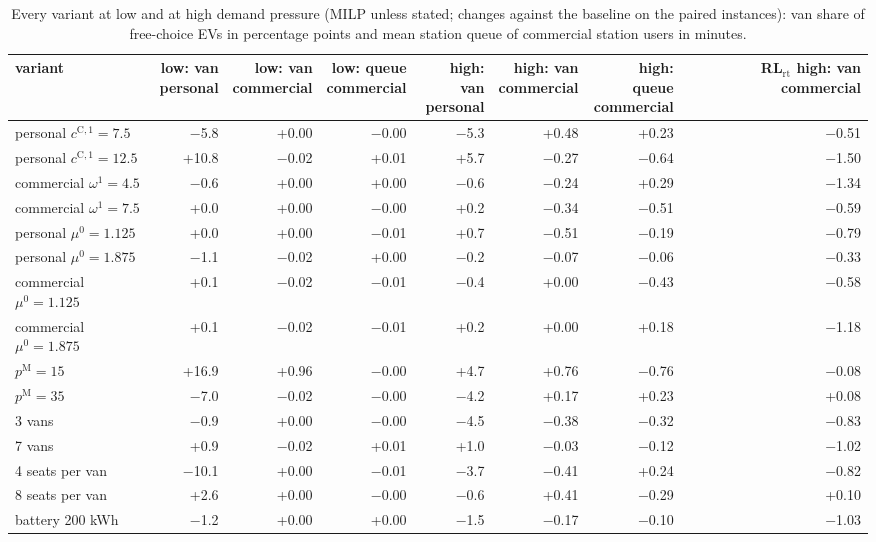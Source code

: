 \begin{table}[H]\centering
\scriptsize
\caption{Every variant at low and at high demand pressure (MILP unless stated; changes against the baseline on the paired instances): van share of free-choice EVs in percentage points and mean station queue of commercial station users in minutes.}\label{tab:pressexp}
\begin{adjustbox}{max width=\textwidth}\begin{tabular}{lrrrrrrr}\toprule
variant & \shortstack{low: van\\personal} & \shortstack{low: van\\commercial} & \shortstack{low: queue\\commercial} & \shortstack{high: van\\personal} & \shortstack{high: van\\commercial} & \shortstack{high: queue\\commercial} & \shortstack{RL$_{\mathrm{rt}}$ high: van\\commercial} \\ \midrule
personal $c^{\mathrm C,1}=7.5$ & $-$5.8 & +0.00 & $-$0.00 & $-$5.3 & +0.48 & +0.23 & $-$0.51 \\
personal $c^{\mathrm C,1}=12.5$ & +10.8 & $-$0.02 & +0.01 & +5.7 & $-$0.27 & $-$0.64 & $-$1.50 \\
commercial $\omega^{1}=4.5$ & $-$0.6 & +0.00 & +0.00 & $-$0.6 & $-$0.24 & +0.29 & $-$1.34 \\
commercial $\omega^{1}=7.5$ & +0.0 & +0.00 & $-$0.00 & +0.2 & $-$0.34 & $-$0.51 & $-$0.59 \\
personal $\mu^{0}=1.125$ & +0.0 & +0.00 & $-$0.01 & +0.7 & $-$0.51 & $-$0.19 & $-$0.79 \\
personal $\mu^{0}=1.875$ & $-$1.1 & $-$0.02 & +0.00 & $-$0.2 & $-$0.07 & $-$0.06 & $-$0.33 \\
commercial $\mu^{0}=1.125$ & +0.1 & $-$0.02 & $-$0.01 & $-$0.4 & +0.00 & $-$0.43 & $-$0.58 \\
commercial $\mu^{0}=1.875$ & +0.1 & $-$0.02 & $-$0.01 & +0.2 & +0.00 & +0.18 & $-$1.18 \\
$p^{\mathrm M}=15$ & +16.9 & +0.96 & $-$0.00 & +4.7 & +0.76 & $-$0.76 & $-$0.08 \\
$p^{\mathrm M}=35$ & $-$7.0 & $-$0.02 & $-$0.00 & $-$4.2 & +0.17 & +0.23 & +0.08 \\
3 vans & $-$0.9 & +0.00 & $-$0.00 & $-$4.5 & $-$0.38 & $-$0.32 & $-$0.83 \\
7 vans & +0.9 & $-$0.02 & +0.01 & +1.0 & $-$0.03 & $-$0.12 & $-$1.02 \\
4 seats per van & $-$10.1 & +0.00 & $-$0.01 & $-$3.7 & $-$0.41 & +0.24 & $-$0.82 \\
8 seats per van & +2.6 & +0.00 & $-$0.00 & $-$0.6 & +0.41 & $-$0.29 & +0.10 \\
battery 200 kWh & $-$1.2 & +0.00 & +0.00 & $-$1.5 & $-$0.17 & $-$0.10 & $-$1.03 \\
\bottomrule\end{tabular}\end{adjustbox}\end{table}
